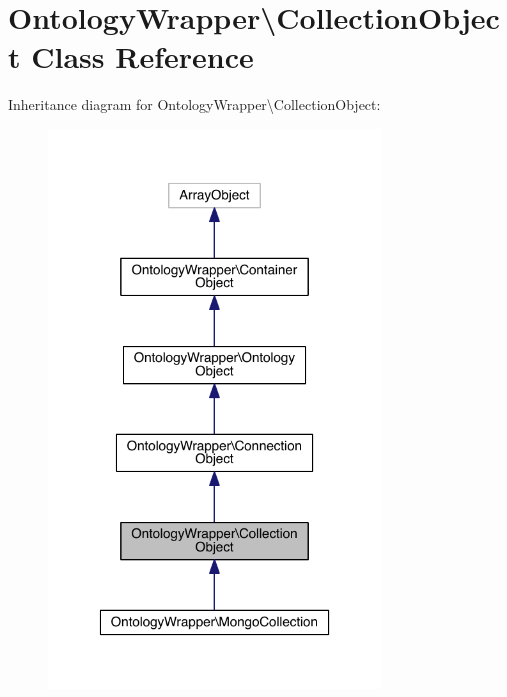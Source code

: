 \hypertarget{class_ontology_wrapper_1_1_collection_object}{\section{Ontology\-Wrapper\textbackslash{}Collection\-Object Class Reference}
\label{class_ontology_wrapper_1_1_collection_object}
}


Inheritance diagram for Ontology\-Wrapper\textbackslash{}Collection\-Object\-:
\nopagebreak
\begin{figure}[H]
\begin{center}
\leavevmode
\includegraphics[width=250pt]{class_ontology_wrapper_1_1_collection_object__inherit__graph}
\end{center}
\end{figure}


